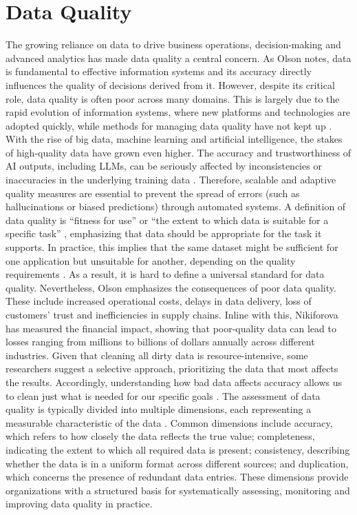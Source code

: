 \section{Data Quality}
The growing reliance on data to drive business operations, decision-making and advanced analytics has made data quality a central concern. 
As Olson \cite{OLSON} notes, data is fundamental to effective information systems and its accuracy directly influences the quality of decisions derived from it. 
However, despite its critical role, data quality is often poor across many domains. 
This is largely due to the rapid evolution of information systems, where new platforms and technologies are adopted quickly, while methods for managing data quality have not kept up \cite{OLSON}. 
With the rise of big data, machine learning and artificial intelligence, the stakes of high-quality data have grown even higher. 
The accuracy and trustworthiness of AI outputs, including LLMs, can be seriously affected by inconsistencies or inaccuracies in the underlying training data \cite{DQA}. 
Therefore, scalable and adaptive quality measures are essential to prevent the spread of errors (such as hallucinations or biased predictions) through automated systems.
\newline\newline
A definition of data quality is “fitness for use” \cite{DQSDQD} or “the extent to which data is suitable for a specific task” \cite{DQA}, emphasizing that data should be appropriate for the task it supports. 
In practice, this implies that the same dataset might be sufficient for one application but unsuitable for another, depending on the quality requirements \cite{DEDQ}. 
As a result, it is hard to define a universal standard for data quality. 
Nevertheless, Olson \cite{OLSON} emphasizes the consequences of poor data quality. 
These include increased operational costs, delays in data delivery, loss of customers' trust and inefficiencies in supply chains. 
Inline with this, Nikiforova \cite{DEDQ} has measured the financial impact, showing that poor-quality data can lead to losses ranging from millions to billions of dollars annually across different industries. 
Given that cleaning all dirty data is resource-intensive, some researchers suggest a selective approach, prioritizing the data that most affects the results. 
Accordingly, understanding how bad data affects accuracy allows us to clean just what is needed for our specific goals \cite{PAPER4}.\newline\newline
The assessment of data quality is typically divided into multiple dimensions, each representing a measurable characteristic of the data \cite{DQSDQD, SDQCPD}. 
Common dimensions include accuracy, which refers to how closely the data reflects the true value; completeness, indicating the extent to which all required data is present; consistency, describing whether the data is in a uniform format across different sources; and duplication, which concerns the presence of redundant data entries. 
These dimensions provide organizations with a structured basis for systematically assessing, monitoring and improving data quality in practice.

